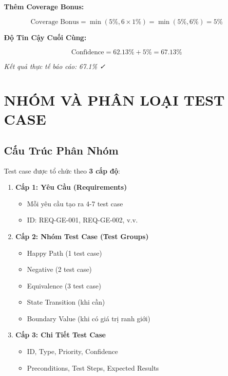\documentclass[12pt, a4paper]{article}
\begin{document}
\textbf{Thêm Coverage Bonus:}

\begin{equation}
\text{Coverage Bonus} = \min(5\%, 6 \times 1\%) = \min(5\%, 6\%) = 5\%
\end{equation}

\textbf{Độ Tin Cậy Cuối Cùng:}

\begin{equation}
\text{Confidence} = 62.13\% + 5\% = 67.13\%
\end{equation}

\textit{Kết quả thực tế báo cáo: 67.1\% ✓}

\newpage

\section{NHÓM VÀ PHÂN LOẠI TEST CASE}

\subsection{Cấu Trúc Phân Nhóm}

Test case được tổ chức theo \textbf{3 cấp độ}:

\begin{enumerate}
    \item \textbf{Cấp 1: Yêu Cầu (Requirements)}
        \begin{itemize}
            \item Mỗi yêu cầu tạo ra 4-7 test case
            \item ID: REQ-GE-001, REQ-GE-002, v.v.
        \end{itemize}
    
    \item \textbf{Cấp 2: Nhóm Test Case (Test Groups)}
        \begin{itemize}
            \item Happy Path (1 test case)
            \item Negative (2 test case)
            \item Equivalence (3 test case)
            \item State Transition (khi cần)
            \item Boundary Value (khi có giá trị ranh giới)
        \end{itemize}
    
    \item \textbf{Cấp 3: Chi Tiết Test Case}
        \begin{itemize}
            \item ID, Type, Priority, Confidence
            \item Preconditions, Test Steps, Expected Results
        \end{itemize}
\end{enumerate}
\end{document}
